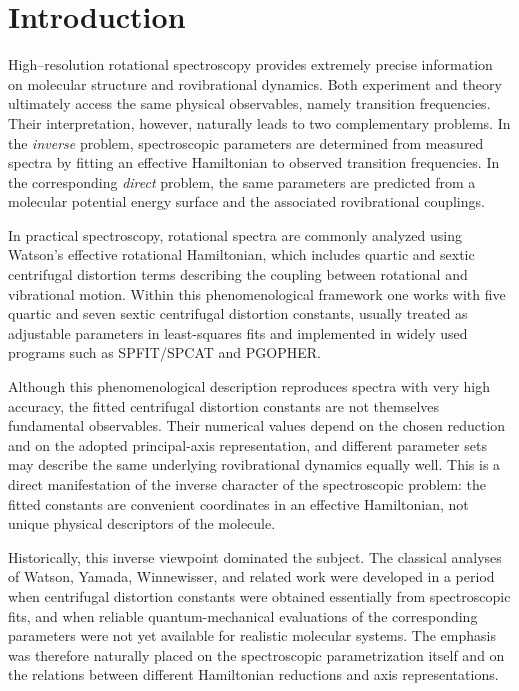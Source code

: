 \section{Introduction}

High--resolution rotational spectroscopy provides extremely precise
information on molecular structure and rovibrational dynamics.
\cite{TownesSchawlow1955,GordyCook1984,BunkerJensen2005}
Both experiment and theory ultimately access the same physical
observables, namely transition frequencies. Their interpretation,
however, naturally leads to two complementary problems.  In the
\emph{inverse} problem, spectroscopic parameters are determined from
measured spectra by fitting an effective Hamiltonian to observed
transition frequencies.\cite{GordyCook1984,TownesSchawlow1955}
In the corresponding \emph{direct} problem, the same parameters are
predicted from a molecular potential energy surface and the associated
rovibrational couplings.\cite{VCI_2022}

In practical spectroscopy, rotational spectra are commonly analyzed
using Watson's effective rotational Hamiltonian,\cite{Watson1968,Watson1977}
which includes quartic and sextic centrifugal distortion terms
describing the coupling between rotational and vibrational motion.
Within this phenomenological framework one works with five quartic and
seven sextic centrifugal distortion constants, usually treated as
adjustable parameters in least-squares fits and implemented in widely
used programs such as SPFIT/SPCAT and PGOPHER.\cite{Pickett1991,Western2017}

Although this phenomenological description reproduces spectra with very
high accuracy, the fitted centrifugal distortion constants are not
themselves fundamental observables. Their numerical values depend on
the chosen reduction and on the adopted principal-axis representation,
and different parameter sets may describe the same underlying
rovibrational dynamics equally well.  This is a direct manifestation of
the inverse character of the spectroscopic problem: the fitted
constants are convenient coordinates in an effective Hamiltonian, not
unique physical descriptors of the molecule.

Historically, this inverse viewpoint dominated the subject.  The
classical analyses of Watson, Yamada, Winnewisser, and related work
were developed in a period when centrifugal distortion constants were
obtained essentially from spectroscopic fits, and when reliable
quantum-mechanical evaluations of the corresponding parameters were not
yet available for realistic molecular systems.  The emphasis was
therefore naturally placed on the spectroscopic parametrization itself
and on the relations between different Hamiltonian reductions and axis
representations.

